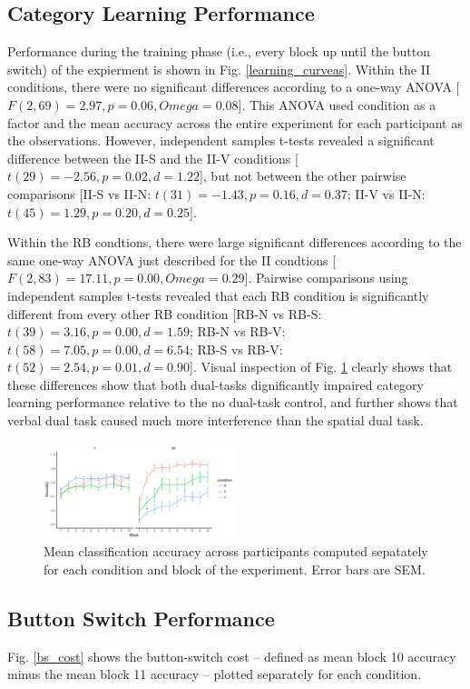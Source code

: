 \documentclass[apacite, draftfirst, jou]{apa6}
\begin{document}
\subsection{Category Learning Performance}
Performance during the training phase (i.e., every block up until the button
switch) of the expierment is shown in Fig. \ref{learning_curveas}. Within the II
conditions, there were no significant differences according to a one-way ANOVA
[$F(2,69) = 2.97, p = 0.06, Omega = 0.08$]. This ANOVA used condition as a
factor and the mean accuracy across the entire experiment for each participant
as the observations. However, independent samples t-tests revealed a significant
difference between the II-S and the II-V conditions [$t(29) = -2.56, p = 0.02, d
= 1.22$], but not between the other pairwise comparisons [II-S vs II-N: $t(31) =
-1.43, p = 0.16, d = 0.37$; II-V vs II-N: $t(45) = 1.29, p = 0.20, d = 0.25$].

Within the RB condtions, there were large significant differences according to
the same one-way ANOVA just described for the II condtions [$F(2,83) = 17.11, p
= 0.00, Omega = 0.29$]. Pairwise comparisons using independent samples t-tests
revealed that each RB condition is significantly different from every other RB
condition [RB-N vs RB-S: $t(39) = 3.16, p = 0.00, d = 1.59$; RB-N vs RB-V:
$t(58) = 7.05, p = 0.00, d = 6.54$; RB-S vs RB-V: $t(52) = 2.54, p = 0.01, d =
0.90$]. Visual inspection of Fig. \ref{learning_curves} clearly shows that these
differences show that both dual-tasks dignificantly impaired category learning
performance relative to the no dual-task control, and further shows that verbal
dual task caused much more interference than the spatial dual task.

\begin{figure}[h]
  \centering
  \includegraphics[width=0.5\textwidth]{../figs/learning_curves.pdf}
  \caption{Mean classification accuracy across participants computed sepatately
    for each condition and block of the experiment. Error bars are SEM.}
  \label{learning_curves}
\end{figure}

\subsection{Button Switch Performance}
Fig. \ref{bs_cost} shows the button-switch cost -- defined as mean block 10
accuracy minus the mean block 11 accuracy -- plotted separately for each
condition.
\end{document}

